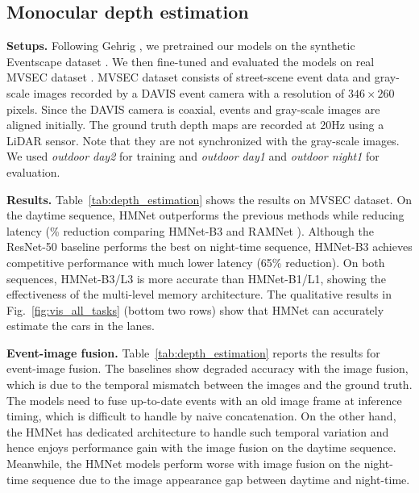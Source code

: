 \subsection{Monocular depth estimation}
\label{sec:depth_estimation}

\noindent
\textbf{Setups.}
Following Gehrig \etal \cite{Gehrig2021}, we pretrained our models on the synthetic Eventscape dataset \cite{Gehrig2021}. We then fine-tuned and evaluated the models on real MVSEC dataset \cite{Zhu2018MVSEC}. MVSEC dataset consists of street-scene event data and gray-scale images recorded by a DAVIS event camera with a resolution of $346\times 260$ pixels. Since the DAVIS camera is coaxial, events and gray-scale images are aligned initially.
The ground truth depth maps are recorded at 20Hz using a LiDAR sensor.
Note that they are not synchronized with the gray-scale images.
We used {\it outdoor day2} for training and {\it outdoor day1} and {\it outdoor night1} for evaluation.

\tbDepthEstimation

\vspace{0.1cm}
\noindent
\textbf{Results.}
Table~\ref{tab:depth_estimation} shows the results on MVSEC dataset.
On the daytime sequence, HMNet outperforms the previous methods while reducing latency (\% reduction comparing HMNet-B3 and RAMNet \cite{Gehrig2021}).
Although the ResNet-50 baseline performs the best on night-time sequence, HMNet-B3 achieves competitive performance with much lower latency (65\% reduction).
On both sequences, HMNet-B3/L3 is more accurate than HMNet-B1/L1, showing the effectiveness of the multi-level memory architecture.
The qualitative results in Fig.~\ref{fig:vis_all_tasks} (bottom two rows) show that HMNet can accurately estimate the cars in the lanes.

\vspace{0.1cm}
\noindent
\textbf{Event-image fusion.}
Table~\ref{tab:depth_estimation} reports the results for event-image fusion.
The baselines show degraded accuracy with the image fusion, which is due to the temporal mismatch between the images and the ground truth.
The models need to fuse up-to-date events with an old image frame at inference timing, which is difficult to handle by naive concatenation.
On the other hand, the HMNet has dedicated architecture to handle such temporal variation and hence enjoys performance gain with the image fusion on the daytime sequence.
Meanwhile, the HMNet models perform worse with image fusion on the night-time sequence due to the image appearance gap between daytime and night-time.

